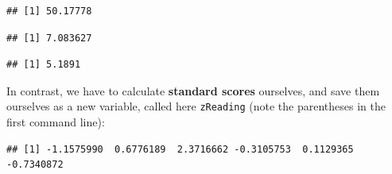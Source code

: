 \documentclass[
]{book}
\newenvironment{Shaded}{\begin{snugshade}}{\end{snugshade}}
\newcommand{\CommentTok}[1]{\textcolor[rgb]{0.56,0.35,0.01}{\textit{#1}}}
\newcommand{\FunctionTok}[1]{\textcolor[rgb]{0.13,0.29,0.53}{\textbf{#1}}}
\newcommand{\NormalTok}[1]{#1}
\newcommand{\OtherTok}[1]{\textcolor[rgb]{0.56,0.35,0.01}{#1}}
\newcommand{\SpecialCharTok}[1]{\textcolor[rgb]{0.81,0.36,0.00}{\textbf{#1}}}
\begin{document}
\begin{Shaded}
\end{Shaded}

\begin{verbatim}
## [1] 50.17778
\end{verbatim}

\begin{Shaded}
\end{Shaded}

\begin{verbatim}
## [1] 7.083627
\end{verbatim}

\begin{Shaded}
\end{Shaded}

\begin{verbatim}
## [1] 5.1891
\end{verbatim}

In contrast, we have to calculate \textbf{standard scores} ourselves, and save them ourselves as a
new variable, called here \texttt{zReading} (note the parentheses in the first command line):

\begin{Shaded}
\end{Shaded}

\begin{verbatim}
## [1] -1.1575990  0.6776189  2.3716662 -0.3105753  0.1129365 -0.7340872
\end{verbatim}
\end{document}
